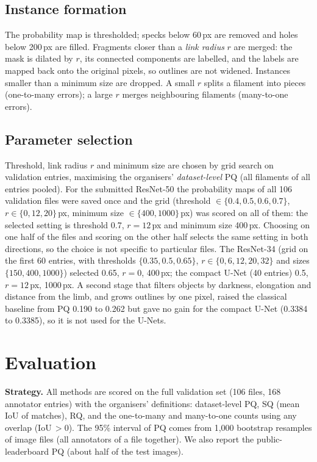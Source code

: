\documentclass[sigconf]{acmart}
\begin{document}
\subsection{Instance formation}
The probability map is thresholded; specks below 60\,px are removed and holes below 200\,px are filled. Fragments closer than a \emph{link radius} $r$ are merged: the mask is dilated by $r$, its connected components are labelled, and the labels are mapped back onto the original pixels, so outlines are not widened. Instances smaller than a minimum size are dropped. A small $r$ splits a filament into pieces (one-to-many errors); a large $r$ merges neighbouring filaments (many-to-one errors).

\subsection{Parameter selection}
Threshold, link radius $r$ and minimum size are chosen by grid search on validation entries, maximising the organisers' \emph{dataset-level} PQ (all filaments of all entries pooled). For the submitted ResNet-50 the probability maps of all 106 validation files were saved once and the grid (threshold $\in\{0.4,0.5,0.6,0.7\}$, $r\in\{0,12,20\}$\,px, minimum size $\in\{400,1000\}$\,px) was scored on all of them: the selected setting is threshold 0.7, $r=12$\,px and minimum size 400\,px. Choosing on one half of the files and scoring on the other half selects the same setting in both directions, so the choice is not specific to particular files. The ResNet-34 (grid on the first 60 entries, with thresholds $\{0.35,0.5,0.65\}$, $r\in\{0,6,12,20,32\}$ and sizes $\{150,400,1000\}$) selected 0.65, $r=0$, 400\,px; the compact U-Net (40 entries) 0.5, $r=12$\,px, 1000\,px. A second stage that filters objects by darkness, elongation and distance from the limb, and grows outlines by one pixel, raised the classical baseline from PQ 0.190 to 0.262 but gave no gain for the compact U-Net (0.3384 to 0.3385), so it is not used for the U-Nets.


\section{Evaluation}\label{sec:evaluation}
\textbf{Strategy.} All methods are scored on the full validation set (106 files, 168 annotator entries) with the organisers' definitions: dataset-level PQ, SQ (mean IoU of matches), RQ, and the one-to-many and many-to-one counts using any overlap (IoU\,$>0$). The 95\% interval of PQ comes from 1,000 bootstrap resamples of image files (all annotators of a file together). We also report the public-leaderboard PQ (about half of the test images).
\end{document}
